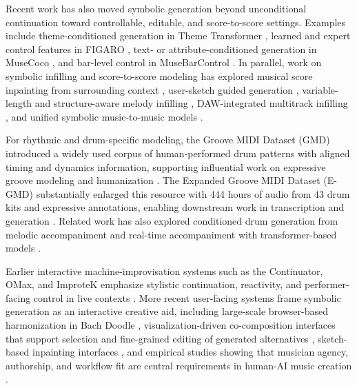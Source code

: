 \documentclass{article}
\begin{document}
Recent work has also moved symbolic generation beyond unconditional continuation toward controllable, editable, and score-to-score settings. Examples include theme-conditioned generation in Theme Transformer \cite{shih2022theme}, learned and expert control features in FIGARO \cite{von2022figaro}, text- or attribute-conditioned generation in MuseCoco \cite{lu2023musecoco}, and bar-level control in MuseBarControl \cite{shu2024musebarcontrol}. In parallel, work on symbolic infilling and score-to-score modeling has explored musical score inpainting from surrounding context \cite{pati2019inpainting}, user-sketch guided generation \cite{chen2020musicsketchnet}, variable-length and structure-aware melody infilling \cite{chang2021variable,tan2022melody}, DAW-integrated multitrack infilling \cite{malandro2024composer}, and unified symbolic music-to-music models \cite{wu2024melodyt5,Jiang2025FunctionAlignment,pasquier2025midi}. 

For rhythmic and drum-specific modeling, the Groove MIDI Dataset (GMD) introduced a widely used corpus of human-performed drum patterns with aligned timing and dynamics information, supporting influential work on expressive groove modeling and humanization \cite{groove2019}. The Expanded Groove MIDI Dataset (E-GMD) substantially enlarged this resource with 444 hours of audio from 43 drum kits and expressive annotations, enabling downstream work in transcription and generation \cite{callender2020improving}. Related work has also explored conditioned drum generation from melodic accompaniment \cite{dahale2022drumaccompaniment} and real-time accompaniment with transformer-based models \cite{Haki2022RealTimeDrumAccompaniment}.

Earlier interactive machine-improvisation systems such as the Continuator, OMax, and ImproteK emphasize stylistic continuation, reactivity, and performer-facing control in live contexts \cite{pachet2003continuator,assayag2006omax,nika2017improtek}. More recent user-facing systems frame symbolic generation as an interactive creative aid, including large-scale browser-based harmonization in Bach Doodle \cite{huang2019bachdoodle}, visualization-driven co-composition interfaces that support selection and fine-grained editing of generated alternatives \cite{rau2022visualization}, sketch-based inpainting interfaces \cite{benetatos2022drawandlisten}, and empirical studies showing that musician agency, authorship, and workflow fit are central requirements in human-AI music creation \cite{huang2020aisongcontest,newman2023humanaimusic}. 
\end{document}
